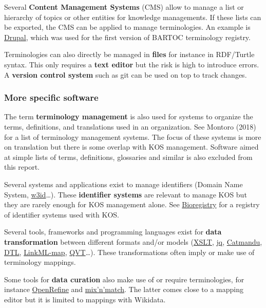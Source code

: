 \documentclass[
  DIV=10]{article}
\begin{document}
Several \textbf{Content Management Systems} (CMS) allow to manage a list
or hierarchy of topics or other entities for knowledge managements. If
these lists can be exported, the CMS can be applied to manage
terminologies. An example is \href{https://www.drupal.org/}{Drupal},
which was used for the first version of BARTOC terminology registry.

Terminologies can also directly be managed in \textbf{files} for
instance in RDF/Turtle syntax. This only requires a \textbf{text editor}
but the risk is high to introduce errors. A \textbf{version control
system} such as git can be used on top to track changes.

\subsubsection{More specific software}\label{more-specific-software}

The term \textbf{terminology management} is also used for systems to
organize the terms, definitions, and translations used in an
organization. See Montoro (2018) for a list of terminology management
systems. The focus of these systems is more on translation but there is
some overlap with KOS management. Software aimed at simple lists of
terms, definitions, glossaries and similar is also excluded from this
report.

Several systems and applications exist to manage identifiers (Domain
Name System, \href{https://w3id.org/}{w3id}\ldots). These
\textbf{identifier systems} are relevant to manage KOS but they are
rarely enough for KOS management alone. See
\href{https://bioregistry.io/}{Bioregistry} for a registry of identifier
systems used with KOS.

Several tools, frameworks and programming languages exist for
\textbf{data transformation} between different formats and/or models
(\href{https://en.wikipedia.org/wiki/XSLT}{XSLT},
\href{https://jqlang.org/}{jq}, \href{https://librecat.org/}{Catmandu},
\href{https://getdtl.org/}{DTL},
\href{https://linkml.io/linkml-map/}{LinkML-map},
\href{https://en.wikipedia.org/wiki/QVT}{QVT}\ldots). These
transformations often imply or make use of terminology mappings.

Some tools for \textbf{data curation} also make use of or require
terminologies, for instance \href{https://openrefine.org/}{OpenRefine}
and \href{https://mix-n-match.toolforge.org/}{mix'n'match}. The latter
comes close to a mapping editor but it is limited to mappings with
Wikidata.
\end{document}
